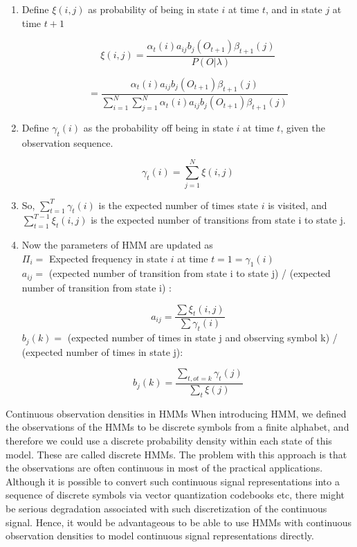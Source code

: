 \begin{enumerate}
	\item Define $\xi(i,j)$ as probability of being in state $i$ at time $t$, and in state $j$ at time $t+1$
	
	\[ \xi(i,j) = \frac{\alpha_{t}(i)a_{ij}b_{j}(O_{t+1})\beta_{t+1}(j)}{P(O|\lambda)} \]
	
	\begin{equation} = \frac{\alpha_{t}(i)a_{ij}b_{j}(O_{t+1})\beta_{t+1}(j)}{\sum_{i=1}^{N} \sum_{j=1}^{N} \alpha_{t}(i)a_{ij}b_{j}(O_{t+1})\beta_{t+1}(j)}  \end{equation}
	
	\item Define $\gamma_{t}(i)$ as the probability off being in state $i$ at time $t$, given the observation sequence.
	
	\begin{equation}
	\gamma_{t}(i) = \sum_{j=1}^{N} \xi(i,j) \end{equation}
	
	\item So, $\sum_{t=1}^{T} \gamma_{t}(i)$ is the expected number of times state $i$ is visited, and $\sum_{t=1}^{T-1}\xi_{t}(i,j)$ is the expected number of transitions from state i to state j.
	
	\item Now the parameters of HMM are updated as \\
	$\Pi_{i} = $ Expected frequency in state $i$ at time $t = 1 = \gamma_{1}(i)$\\
	$a_{ij} = $ (expected number of transition from state i to state j) / (expected number of transition from state i) :
	
	\begin{equation} a_{ij} = \frac{\sum \xi_{t}(i,j)}{\sum \gamma_{t}(i)} \end{equation}
	$b_{j}(k) = $ (expected number of times in state j and observing symbol k) / (expected number of times in state j):
	
	\begin{equation} b_{j}(k) = \frac{\sum_{t,ot=k} \gamma_{t}(j)}{\sum_{t}\xi(j)} \end{equation}
\end{enumerate}

Continuous observation densities in HMMs When introducing HMM, we defined the observations of the HMMs to be discrete symbols from a finite alphabet, and therefore we could use a discrete probability density within each state of this model. These are called discrete HMMs. The problem with this approach is that the observations are often continuous in most of the practical applications. Although it is possible to convert such continuous signal representations into a sequence of discrete symbols via vector quantization codebooks etc, there might be serious degradation associated with such discretization of the continuous signal. Hence, it would be advantageous to be able to use HMMs with continuous observation densities to model continuous signal representations directly.

